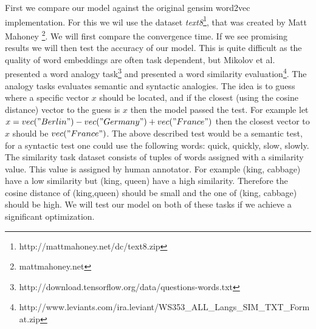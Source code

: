 First we compare our model against the original gensim word2vec implementation. For this we wil use the dataset \textit{text8}\footnote{ http://mattmahoney.net/dc/text8.zip }, that was created by Matt Mahoney \footnote{mattmahoney.net}. We will first compare the convergence time. If we see promising results we will then test the accuracy of our model. This is quite difficult as the quality of word embeddings are often task dependent, but Mikolov et al. \cite{mikolov2} presented a word analogy task\footnote{http://download.tensorflow.org/data/questions-words.txt} and  \cite{wSimilarity} presented a  word similarity evaluation\footnote{ http://www.leviants.com/ira.leviant/WS353\_ALL\_Langs\_SIM\_TXT\_Format.zip}. The analogy tasks evaluates semantic and syntactic analogies. The idea is to guess where a specific vector $x$ should be located, and if the closest (using the cosine distance) vector to the guess is $x$ then the model passed the test. For example let $x = vec("Berlin") - vec("Germany") + vec("France")$ then the closest vector to $x$ should be $vec("France")$. The above described test would be a semantic test, for a syntactic test one could use the following words: quick, quickly, slow, slowly. The similarity task dataset consists of tuples of words assigned with a similarity value. This value is assigned by human annotator. For example (king, cabbage) have a low similarity but (king, queen) have a high similarity. Therefore the cosine distance of (king,queen) should be small and the one of (king, cabbage) should be high. We will test our model on both of these tasks if we achieve a significant optimization. 

